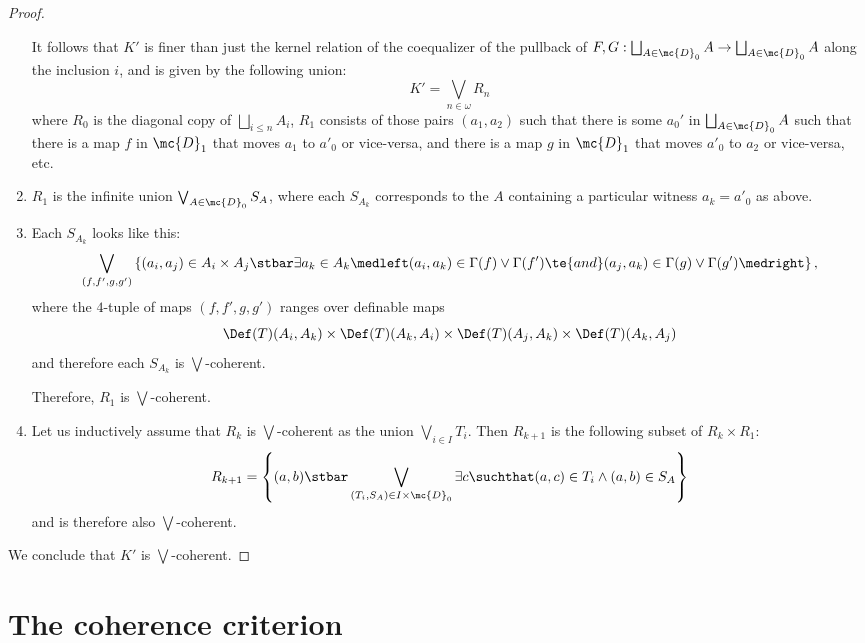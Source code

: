 \begin{proof}
\begin{enumerate}
  It follows that $K'$ is finer than just the kernel relation of the coequalizer of the pullback of $F, G : \bigsqcup_{A \in \mc{D}_0} A \to \bigsqcup_{A \in \mc{D}_0} A$ along the inclusion $i$, and is given by the following union:
  $$
K' = \bigvee_{n \in \omega} R_n
$$
where $R_0$ is the diagonal copy of $\bigsqcup_{i \leq n} A_i$, $R_1$ consists of those pairs $(a_1, a_2)$ such that there is some $a_0'$ in $\bigsqcup_{A \in \mc{D}_0} A$ such that there is a map $f$ in $\mc{D}_1$ that moves $a_1$ to $a'_0$ or vice-versa, and there is a map $g$ in $\mc{D}_1$ that moves $a'_0$ to $a_2$ or vice-versa, etc.
  
\item $R_1$ is the infinite union $\bigvee_{A \in \mc{D}_0} S_A$, where each $S_{A_k}$ corresponds to the $A$ containing a particular witness $a_k = a'_0$ as above.

\item Each $S_{A_k}$ looks like this:
  $$
\bigvee_{(f, f', g, g')} \left\{(a_i, a_j) \in A_i \times A_j \stbar \exists a_k \in A_k \medleft(a_i, a_k) \in \Gamma(f) \lor \Gamma(f') \te{ and } (a_j, a_k) \in \Gamma(g) \lor \Gamma(g')\medright\right\},
$$
where the $4$-tuple of maps $(f, f', g, g')$ ranges over definable maps $$\Def(T)(A_i, A_k) \times \Def(T)(A_k, A_i) \times \Def(T)(A_j, A_k) \times \Def(T)(A_k, A_j)$$ and therefore each $S_{A_k}$ is $\bigvee$-coherent.

Therefore, $R_1$ is $\bigvee$-coherent.
  
\item Let us inductively assume that $R_k$ is $\bigvee$-coherent as the union $\bigvee_{i \in I} T_{i}$. Then $R_{k+1}$ is the following subset of $R_{k} \times R_1$:
  $$
R_{k+1} = \left\{(a,b) \stbar \bigvee_{(T_i, S_A) \in I \times \mc{D}_0} \exists c \suchthat (a,c) \in T_i \land (a,b) \in S_A\right\}
$$
and is therefore also $\bigvee$-coherent.
\end{enumerate}

We conclude that $K'$ is $\bigvee$-coherent.
\end{proof}
\section{The coherence criterion}

